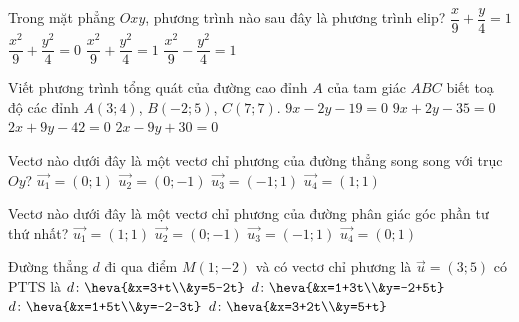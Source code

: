 \begin{ex}%
	Trong mặt phẳng $Oxy$, phương trình nào sau đây là phương trình elip?
	\choice
	{$\dfrac{x}{9}+\dfrac{y}{4}=1$}
	{$\dfrac{x^2}{9}+\dfrac{y^2}{4}=0$}
	{\True $\dfrac{x^2}{9}+\dfrac{y^2}{4}=1$}
	{$\dfrac{x^2}{9}-\dfrac{y^2}{4}=1$}
\end{ex}	
	\begin{ex}%
		Viết phương trình tổng quát của đường cao đỉnh $A$ của tam giác $ABC$ biết toạ độ các đỉnh $A\left( 3;4 \right)$, $B\left( -2;5 \right)$, $C\left( 7;7 \right)$.
		\choice
		{$9x-2y-19=0$}
		{\True $9x+2y-35=0$}
		{$2x+9y-42=0$}
		{$2x-9y+30=0$}
	\end{ex}

	\begin{ex}%
	Vectơ nào dưới đây là một vectơ chỉ phương của đường thẳng song song với trục $Oy$?
		\choice
	{\True $\overrightarrow{u_{1}}=(0;1)$}
	{$\overrightarrow{u_{2}}=(0;-1)$}
	{$\overrightarrow{u_{3}}=(-1;1)$}
	{$\overrightarrow{u_{4}}=(1;1)$}
\end{ex}
	\begin{ex}%
	Vectơ nào dưới đây là một vectơ chỉ phương của đường phân giác góc phần tư thứ nhất?
		\choice
	{\True $\overrightarrow{u_{1}}=(1;1)$}
	{$\overrightarrow{u_{2}}=(0;-1)$}
	{$\overrightarrow{u_{3}}=(-1;1)$}
	{$\overrightarrow{u_{4}}=(0;1)$}
\end{ex}

	\begin{ex}%
	Đường thẳng $d$ đi qua điểm $M(1;-2)$ và có  vectơ chỉ phương là $\overrightarrow{u}=(3;5)$ có PTTS là
		\choice
	{$d \colon \heva{&x=3+t\\&y=5-2t}$}
	{\True $d \colon \heva{&x=1+3t\\&y=-2+5t}$}
	{$d \colon \heva{&x=1+5t\\&y=-2-3t}$}
	{$d \colon \heva{&x=3+2t\\&y=5+t}$}
\end{ex}

